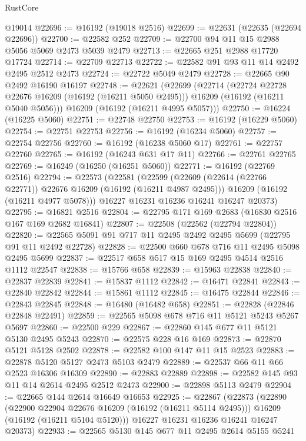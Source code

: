 \begin{lexlean}{RustCore}
\begin{coremodule}
    @19014
@22696 := @16192 (@19018 @2516)
@22699 := @22631 (@22635 (@22694 @22696))
@22700 := @22582 @252
@22709 := @22700 @94 @11 @15 @2988 @5056 @5069 @2473 @5039 @2479
@22713 := @22665 @251 @2988 @17720 @17724
@22714 := @22709 @22713
@22722 := @22582 @91 @93 @11 @14 @2492 @2495 @2512 @2473
@22724 := @22722 @5049 @2479
@22728 := @22665 @90 @2492 @16190 @16197
@22748 := @22621
    (@22699
      (@22714
        (@22724 @22728 @22676 @16209 (@16192 (@16211 @5050 @2495)))
        @16209
        (@16192 (@16211 @5040 @5056)))
      @16209
      (@16192 (@16211 @4995 @5057)))
@22750 := @16224 (@16225 @5060)
@22751 := @22748 @22750
@22753 := @16192 (@16229 @5060)
@22754 := @22751 @22753
@22756 := @16192 (@16234 @5060)
@22757 := @22754 @22756
@22760 := @16192 (@16238 @5060 @17)
@22761 := @22757 @22760
@22765 := @16192 (@16243 @631 @17 @11)
@22766 := @22761 @22765
@22769 := @16249 (@16250 (@16251 @5060))
@22771 := @16192 (@22769 @2516)
@22794 := @22573
    (@22581
      (@22599
        (@22609 (@22614 (@22766 @22771)) @22676 @16209 (@16192 (@16211 @4987 @2495)))
        @16209
        (@16192 (@16211 @4977 @5078)))
      @16227
      @16231
      @16236
      @16241
      @16247
      @20373)
@22795 := @16821 @2516
@22804 := @22795 @171 @169 @2683 (@16830 @2516 @167 @169 @2682 @16841)
@22807 := @22508 (@22562 (@22794 @22804))
@22820 := @22565 @5091 @91 @717 @11 @2495 @2492 @2495 @5699 (@22795 @91 @11 @2492 @22728)
@22828 := @22500 @660 @678 @716 @11 @2495 @5098 @2495 @5699
@22837 := @22517 @658 @517 @15 @169 @2495 @4514 @2516 @1112 @22547
@22838 := @15766 @658
@22839 := @15963 @22838
@22840 := @22837 @22839
@22841 := @15837 @1112
@22842 := @16471 @22841
@22843 := @22840 @22842
@22844 := @15861 @1112
@22845 := @16475 @22844
@22846 := @22843 @22845
@22848 := @16480 (@16482 @658)
@22851 := @22828 (@22846 @22848 @22491)
@22859 := @22565 @5098 @678 @716 @11 @5121 @5243 @5267 @5697
@22860 := @22500 @229
@22867 := @22860 @145 @677 @11 @5121 @5130 @2495 @5243
@22870 := @22575 @228 @16 @169
@22873 := @22870 @5121 @5128 @2502
@22878 := @22582 @100 @147 @11 @15 @2523
@22883 := @22878 @5120 @5127 @2473 @5103 @2479
@22889 := @22537 @66 @11 @66 @2523 @16306 @16309
@22890 := @22883 @22889
@22898 := @22582 @145 @93 @11 @14 @2614 @2495 @2512 @2473
@22900 := @22898 @5113 @2479
@22904 := @22665 @144 @2614 @16649 @16653
@22925 := @22867
    (@22873
      (@22890
        (@22900 @22904 @22676 @16209 (@16192 (@16211 @5114 @2495)))
        @16209
        (@16192 (@16211 @5104 @5120)))
      @16227
      @16231
      @16236
      @16241
      @16247
      @20373)
@22933 := @22565 @5130 @145 @677 @11 @2495 @2614 @5155 @5241

\end{coremodule}
\end{lexlean}
